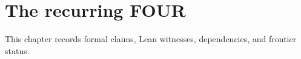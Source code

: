 \chapter{The recurring FOUR}\label{ch:four}

This chapter records formal claims, Lean witnesses, dependencies, and frontier status.









